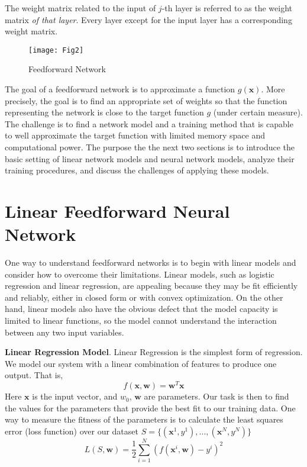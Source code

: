 The weight matrix related to the input of $j$-th layer is referred to as the weight matrix \textit{of that layer}. Every layer except for the input layer has a corresponding weight matrix.

\begin{wrapfigure}{r}{0.5\textwidth}
\centering
\texttt{[image: Fig2]}
\caption{Feedforward Network}
\label{fig2}
\end{wrapfigure}

The goal of a feedforward network is to approximate a function $g(\bm{x})$. More precisely, the goal is to find an appropriate set of weights so that the function representing the network is close to the target function $g$ (under certain measure). The challenge is to find a network model and a training method that is capable to well approximate the target function with limited memory space and computational power. The purpose the the next two sections is to introduce the basic setting of linear network models and neural network models, analyze their training procedures, and discuss the challenges of applying these models. 

\section{Linear Feedforward Neural Network}
One way to understand feedforward networks is to begin with linear models and consider how to overcome their limitations. Linear models, such as logistic regression and linear regression, are appealing because they may be fit efficiently and reliably, either in closed form or with convex optimization. On the other hand, linear models also have the obvious defect that the model capacity is limited to linear functions, so the model cannot understand the interaction between any two input variables.

{\bf Linear Regression Model}. Linear Regression is the simplest form of regression. We model our system with a linear combination of features to produce one output. That is,
\begin{equation}
  f(\bm x, \bm w) = \bm w^T\bm x
\end{equation}
Here $\bm x$ is the input vector, and $w_0$, $\bm w$ are parameters. Our task is then to find the values for the parameters that provide the best fit to our training data. One way to measure the fitness of the parameters is to calculate the least squares error (loss function) over our dataset $S = \{(\bm x^1, y^1), ..., (\bm x^N, y^N)\}$
\begin{equation}
  L(S, \bm w) = \frac{1}{2}\sum_{i=1}^N(f(\bm x^i, \bm w)-y^i)^2
\end{equation}

